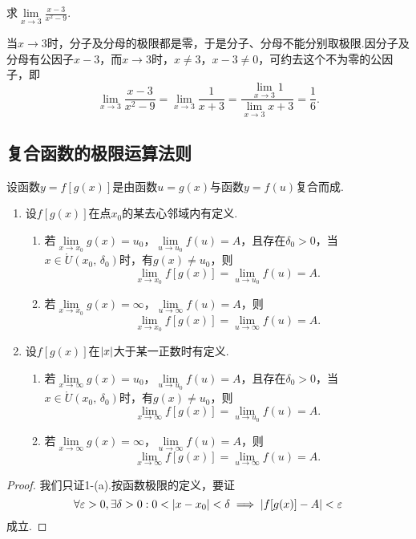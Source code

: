\begin{example}
求\(\lim\limits_{x \to 3}\frac{x-3}{x^2-9}\).
\begin{solution}
当\(x \to 3\)时，分子及分母的极限都是零，于是分子、分母不能分别取极限.因分子及分母有公因子\(x - 3\)，而\(x \to 3\)时，\(x \neq 3\)，\(x - 3 \neq 0\)，可约去这个不为零的公因子，即\[
\lim\limits_{x \to 3}\frac{x - 3}{x^2 - 9}
= \lim\limits_{x \to 3}\frac{1}{x + 3}
= \frac{\lim\limits_{x \to 3} 1}{\lim\limits_{x \to 3} x+3}
= \frac{1}{6}.
\]
\end{solution}
\end{example}

\subsection{复合函数的极限运算法则}
\begin{theorem}
设函数\(y=f[g(x)]\)是由函数\(u=g(x)\)与函数\(y=f(u)\)复合而成.
\begin{enumerate}
\item 设\(f[g(x)]\)在点\(x_0\)的某去心邻域内有定义.
\begin{enumerate}
\item 若\(\lim\limits_{x \to x_0} g(x) = u_0\)，\(\lim\limits_{u \to u_0} f(u) = A\)，且存在\(\delta_0 > 0\)，当\(x \in \mathring{U}(x_0,\,\delta_0)\)时，有\(g(x) \neq u_0\)，则\[
\lim\limits_{x \to x_0} f[g(x)] = \lim\limits_{u \to u_0} f(u) = A.
\]
\item 若\(\lim\limits_{x \to x_0}g(x) = \infty\)，\(\lim\limits_{u \to \infty}f(u) = A\)，则\[
\lim\limits_{x \to x_0} f[g(x)] = \lim\limits_{u \to \infty} f(u) = A.
\]
\end{enumerate}
\item 设\(f[g(x)]\)在\(\abs{x}\)大于某一正数时有定义.
\begin{enumerate}
\item 若\(\lim\limits_{x \to \infty} g(x) = u_0\)，\(\lim\limits_{u \to u_0} f(u) = A\)，且存在\(\delta_0 > 0\)，当\(x \in \mathring{U}(x_0,\,\delta_0)\)时，有\(g(x) \neq u_0\)，则\[
\lim\limits_{x \to \infty} f[g(x)] = \lim\limits_{u \to u_0} f(u) = A.
\]
\item 若\(\lim\limits_{x \to \infty}g(x) = \infty\)，\(\lim\limits_{u \to \infty}f(u) = A\)，则\[
\lim\limits_{x \to \infty} f[g(x)] = \lim\limits_{u \to \infty} f(u) = A.
\]
\end{enumerate}
\end{enumerate}
\begin{proof}
我们只证1-(a).按函数极限的定义，要证\[
\forall\varepsilon>0, \exists\delta>0 :
0 < \abs{x - x_0} < \delta
\implies
\abs{ f[g(x)] - A } < \varepsilon
\]成立.


\end{proof}
\end{theorem}
